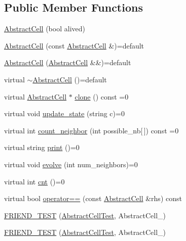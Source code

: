 \subsection*{Public Member Functions}
\begin{DoxyCompactItemize}
\item 
\hyperlink{classAbstractCell_af753342773dbd879161d9c9b1afe9874}{Abstract\-Cell} (bool alived)
\item 
\hyperlink{classAbstractCell_a92a128eb6dbabbdcfba8973503aea71e}{Abstract\-Cell} (const \hyperlink{classAbstractCell}{Abstract\-Cell} \&)=default
\item 
\hyperlink{classAbstractCell_ad8eea1ec8c279add40136cd28db11e97}{Abstract\-Cell} (\hyperlink{classAbstractCell}{Abstract\-Cell} \&\&)=default
\item 
virtual \hyperlink{classAbstractCell_a6d8ce67b93514f1fc2f564a7bb09cf85}{$\sim$\-Abstract\-Cell} ()=default
\item 
virtual \hyperlink{classAbstractCell}{Abstract\-Cell} $\ast$ \hyperlink{classAbstractCell_a1a95a7ea92b3503e2f042170b6320354}{clone} () const =0
\item 
virtual void \hyperlink{classAbstractCell_a67008aedffea84aac7088ec84e8441cc}{update\-\_\-state} (string c)=0
\item 
virtual int \hyperlink{classAbstractCell_af566abaafe33b73bae0874566a987b63}{count\-\_\-neighbor} (int possible\-\_\-nb\mbox{[}$\,$\mbox{]}) const =0
\item 
virtual string \hyperlink{classAbstractCell_a63e875724c1ee0278449d9489211baa7}{print} ()=0
\item 
virtual void \hyperlink{classAbstractCell_ad46c73f9a67419ecd570a7677525054f}{evolve} (int num\-\_\-neighbors)=0
\item 
virtual int \hyperlink{classAbstractCell_aac03c6e21580569ae306909e68feae9d}{cnt} ()=0
\item 
virtual bool \hyperlink{classAbstractCell_a9eb218c97afe5618c8e2783335cc425c}{operator==} (const \hyperlink{classAbstractCell}{Abstract\-Cell} \&rhs) const 
\item 
\hyperlink{classAbstractCell_a60254ac736576a6645b6863926f86fc1}{F\-R\-I\-E\-N\-D\-\_\-\-T\-E\-S\-T} (\hyperlink{classAbstractCell_a8a83d646164e396527131ba80ec82bdc}{Abstract\-Cell\-Test}, Abstract\-Cell\-\_)
\item 
\hyperlink{classAbstractCell_a1c4e29381db068d39eac4a103587151f}{F\-R\-I\-E\-N\-D\-\_\-\-T\-E\-S\-T} (\hyperlink{classAbstractCell_a8a83d646164e396527131ba80ec82bdc}{Abstract\-Cell\-Test}, Abstract\-Cell\-\_)

\end{DoxyCompactItemize}
